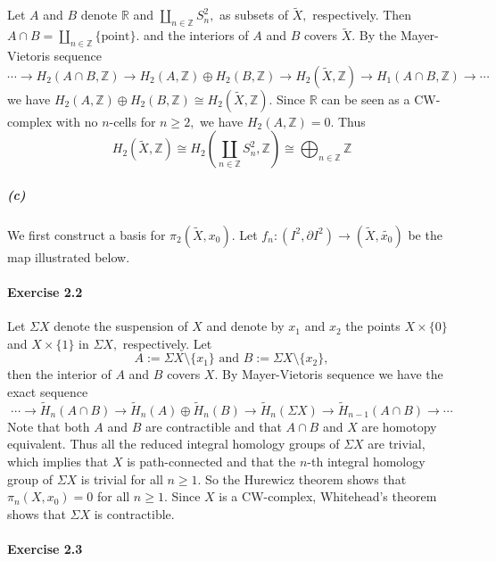 \documentclass{article}
\begin{document}
Let $A$ and $B$ denote $\mathbb{R}$ and $\coprod_{n\in\mathbb{Z}}S_n^2,$ as subsets of $\widetilde{X},$ respectively. Then $A\cap B=\coprod_{n\in\mathbb{Z}}\{\text{point}\}.$ and the interiors of $A$ and $B$ covers $\widetilde{X}.$ By the Mayer-Vietoris sequence
\[\cdots\rightarrow H_2(A\cap B,\mathbb{Z})\rightarrow H_2(A,\mathbb{Z})\oplus H_2(B,\mathbb{Z})\rightarrow H_2(\widetilde{X},\mathbb{Z})\rightarrow H_1(A\cap B,\mathbb{Z})\rightarrow\cdots\]
we have $H_2(A,\mathbb{Z})\oplus H_2(B,\mathbb{Z})\cong H_2(\widetilde{X},\mathbb{Z}).$ Since $\mathbb{R}$ can be seen as a CW-complex with no $n$-cells for $n\geq2,$ we have $H_2(A,\mathbb{Z})=0.$ Thus
\[H_2(\widetilde{X},\mathbb{Z})\cong H_2\left(\coprod_{n\in\mathbb{Z}}S_n^2,\mathbb{Z}\right)\cong\bigoplus_{n\in\mathbb{Z}}\mathbb{Z}\]


\subparagraph{(c)}We first construct a basis for $\pi_2(\widetilde{X},x_0).$ Let $f_n\colon (I^2,\partial I^2)\rightarrow (\widetilde{X}, \tilde{x_0})$ be the map illustrated below.


\paragraph{Exercise 2.2}Let $\Sigma X$ denote the suspension of $X$ and denote by $x_1$ and $x_2$ the points $X\times\{0\}$ and $X\times\{1\}$ in $\Sigma X, $ respectively. Let
\[A:=\Sigma X\setminus \{x_1\}\text{ and }B:=\Sigma X\setminus \{x_2\},\]
then the interior of $A$ and $B$ covers $X.$ By Mayer-Vietoris sequence we have the exact sequence
\[\cdots\rightarrow \widetilde{H}_n(A\cap B)\rightarrow \widetilde{H}_n(A)\oplus \widetilde{H}_n(B)\rightarrow \widetilde{H}_n(\Sigma X)\rightarrow \widetilde{H}_{n-1}(A\cap B)\rightarrow\cdots\]
Note that both $A$ and $B$ are contractible and that $A\cap B$ and $X$ are homotopy equivalent. Thus all the reduced integral homology groups of $\Sigma X$ are trivial, which implies that $X$ is path-connected and that the $n$-th integral homology group of $\Sigma X$ is trivial for all $n\geq 1.$ So the Hurewicz theorem shows that $\pi_n(X,x_0)=0$ for all $n\geq1.$ Since $X$ is a CW-complex, Whitehead's theorem shows that $\Sigma X$ is contractible.

\paragraph{Exercise 2.3}
\end{document}
